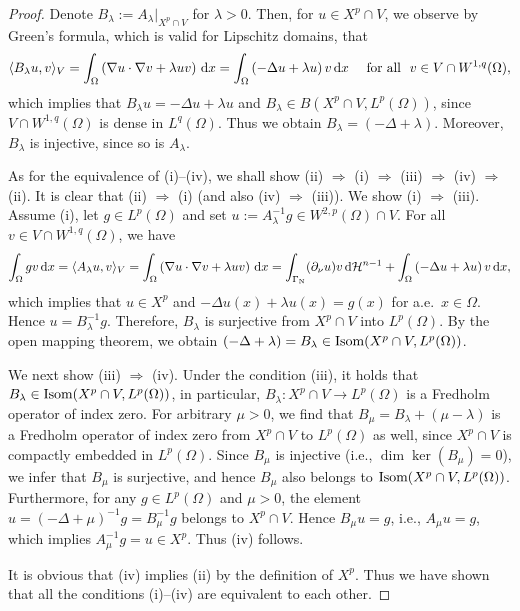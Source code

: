 \documentclass[reqno,10pt]{amsart}
\begin{document}
\begin{proof}
Denote $B_\lambda :=A_\lambda |_{X^p\cap V}$ for
$\lambda >0$. Then, for $u\in X^p\cap
V$, we observe by Green's formula, which is valid for Lipschitz domains,
 that
\begin{align*}
\langle B_\lambda u,v\rangle_V =
\int_\Omega \left( \nabla u\cdot\nabla v + \lambda uv \right)\,{\text{\rm d}} x
= \int_\Omega \left( -\Delta u + \lambda u \right) v \, {\text{\rm d}} x
\quad \mbox{ for all } \ v\in V \cap W^{1,q}(\Omega),
\end{align*}
which implies that $B_\lambda u =-\Delta u +\lambda u$ and
 $B_\lambda \in B(X^p\cap V,L^p(\Omega))$, since $V \cap
 W^{1,q}(\Omega)$ is dense in $L^q(\Omega)$. Thus we obtain $B_\lambda =
 (-\Delta + \lambda)$. Moreover, $B_\lambda$ is injective, since so is
 $A_\lambda$.

As for the equivalence of (i)--(iv), we shall show (ii) $\Rightarrow$
 (i) $\Rightarrow$ (iii) $\Rightarrow$ (iv) $\Rightarrow$ (ii).
It is clear that (ii) $\Rightarrow$ (i) (and also (iv) $\Rightarrow$ (iii)).
We show (i) $\Rightarrow$ (iii). Assume (i), let $g\in L^p(\Omega)$ and
set $u:=A_\lambda^{-1}g\in W^{2,p}(\Omega)\cap V$. 
For all $v\in V \cap W^{1,q}(\Omega)$, we have
\begin{align*}
\int_\Omega gv \,{\text{\rm d}} x
=\langle A_\lambda u,v\rangle_V =
\int_\Omega \left( \nabla u\cdot\nabla v + \lambda uv \right)\,{\text{\rm d}} x
= \int_{{\Gamma_{\rm\scriptsize N}}} (\partial_\nu u) v \,{\text{\rm d}}{{\mathcal H}}^{n-1} +
\int_\Omega \left(-\Delta u+\lambda u\right)v \,{\text{\rm d}} x,
\end{align*}
which implies that $u\in X^p$ and $-\Delta u(x)+\lambda u(x)=g(x)$ for a.e.~$x \in \Omega$. Hence $u = B_\lambda^{-1} g$. Therefore,
$B_\lambda$ is surjective from $X^p \cap V$ into
 $L^p(\Omega)$. By the open mapping theorem, we obtain 
$(-\Delta +\lambda ) = B_\lambda \in {\mbox{\rm Isom}} (X^p\cap V,L^p(\Omega))$.

We next show (iii) $\Rightarrow$ (iv).
Under the condition (iii), it holds that 
$B_\lambda \in {\mbox{\rm Isom}} (X^p\cap V,L^p(\Omega))$,
in particular, $B_\lambda : X^p\cap V \to L^p(\Omega)$ is a
 Fredholm operator of index zero.
For arbitrary $\mu >0$, we find that $B_\mu =B_\lambda +(\mu
 -\lambda)$ is a Fredholm operator of index zero from $X^p\cap V$
 to $L^p(\Omega)$ as well, since $X^p \cap V$ is compactly embedded in
 $L^p(\Omega)$. Since $B_\mu$ is injective (i.e., $\dim \ker(B_\mu) =
 0$), we infer that $B_\mu$ is surjective, and hence $B_\mu$ also
 belongs to ${\mbox{\rm Isom}} (X^p\cap V,L^p(\Omega))$. Furthermore, for any $g \in
 L^p(\Omega)$ and $\mu > 0$, the element $u = (-\Delta + \mu)^{-1}g =
 B_\mu^{-1} g$ belongs to $X^p \cap V$. Hence $B_\mu u = g$,
 i.e., $A_\mu u = g$, which implies $A_\mu^{-1} g = u \in X^p$.
Thus (iv) follows.

It is obvious that (iv) implies (ii) by the definition of $X^p$.
Thus we have shown that all the conditions (i)--(iv) are equivalent to
 each other.
\end{proof}
\end{document}
